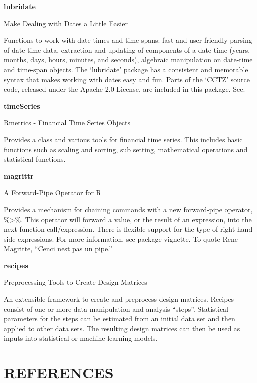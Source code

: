 \documentclass[12pt,openany]{book}
\begin{document}
\textbf{lubridate}

Make Dealing with Dates a Little Easier

Functions to work with date-times and time-spans: fast and user friendly parsing of date-time data, extraction and updating of components of a date-time (years, months, days, hours, minutes, and seconds), algebraic manipulation on date-time and time-span objects. The `lubridate' package has a consistent and memorable syntax that makes working with dates easy and fun. Parts of the `CCTZ' source code, released under the Apache 2.0 License, are included in this package. See.

\textbf{timeSeries}

Rmetrics - Financial Time Series Objects

Provides a class and various tools for financial time series. This includes basic functions such as scaling and sorting, sub setting, mathematical operations and statistical functions.

\textbf{magrittr}

A Forward-Pipe Operator for R

Provides a mechanism for chaining commands with a new forward-pipe operator, \%\textgreater{}\%. This operator will forward a value, or the result of an expression, into the next function call/expression. There is flexible support for the type of right-hand side expressions. For more information, see package vignette. To quote Rene Magritte, ``Cenci nest pas un pipe.''

\textbf{recipes}

Preprocessing Tools to Create Design Matrices

An extensible framework to create and preprocess design matrices. Recipes consist of one or more data manipulation and analysis ``steps''. Statistical parameters for the steps can be estimated from an initial data set and then applied to other data sets. The resulting design matrices can then be used as inputs into statistical or machine learning models.

\hypertarget{references}{%
\chapter*{REFERENCES}\label{references}}
\end{document}
